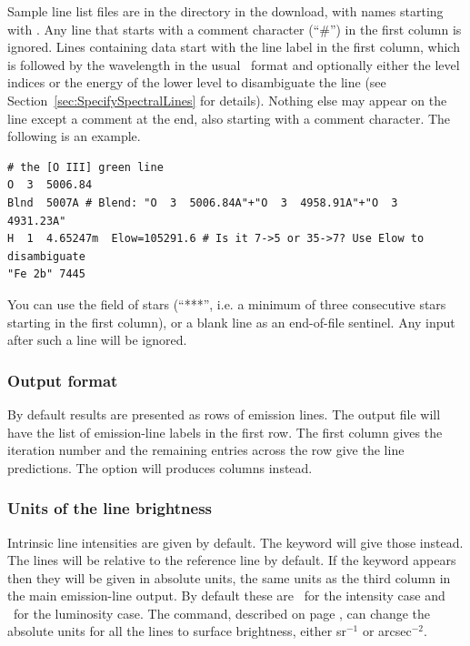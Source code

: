 Sample line list files are in the  directory in the download, with
names starting with .
Any line that starts with a comment character (``\#'') in the first column is ignored.
Lines containing data start with the line label in the first column,
which is followed by the wavelength in the usual \Cloudy\ format
and optionally either the level indices or the energy of the lower level to disambiguate the line
(see Section~\ref{sec:SpecifySpectralLines} for details).
Nothing else may appear on the line except a comment at the end, also starting with a comment character.
The following is an example.
\begin{verbatim}
# the [O III] green line
O  3  5006.84
Blnd  5007A # Blend: "O  3  5006.84A"+"O  3  4958.91A"+"O  3  4931.23A"
H  1  4.65247m  Elow=105291.6 # Is it 7->5 or 35->7? Use Elow to disambiguate
"Fe 2b" 7445
\end{verbatim}
You can use the field of stars (``***'', i.e. a minimum of three consecutive stars
starting in the first column), or a blank line as an end-of-file sentinel. Any
input after such a line will be ignored.

\subsubsection{Output format}
By default results are presented as rows of emission lines.
The output file will have the list of emission-line labels in the first
row.  The first column gives the iteration number and the remaining
entries across the row give the line predictions.
The  option will produces columns instead.

\subsubsection{Units of the line brightness}
Intrinsic line intensities are given by default.
The keyword  will give those instead.
The lines will be relative to the reference line by default.
If the keyword  appears then they will be given
in absolute units, the same units as the third column in
the main emission-line output.
By default these are \ergpscmps\
for the intensity case and \ergps\ for the luminosity case.
The  command,
described on page \pageref{sec:CommandPrintLineSurfaceBrightness},
can change the absolute units for all the lines to surface brightness,
either sr$^{-1}$ or arcsec$^{-2}$.

